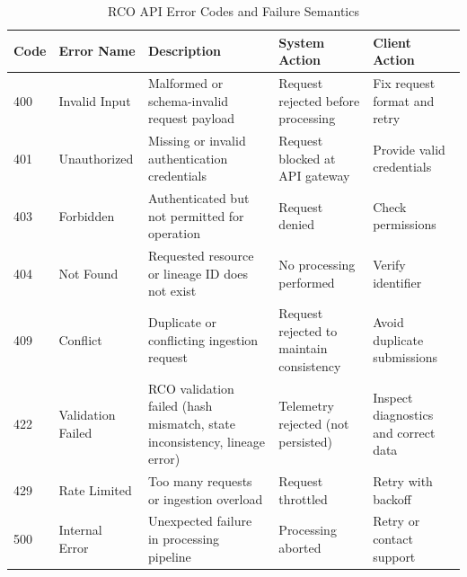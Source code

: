 \begin{table}[htbp]
\footnotesize
\centering
\caption{RCO API Error Codes and Failure Semantics}
\label{tab:error-codes}

\renewcommand{\arraystretch}{1.25}

\begin{tabularx}{\textwidth}{|p{2cm}|p{3cm}|X|X|X|}
\hline
\textbf{Code} & \textbf{Error Name} & \textbf{Description} & \textbf{System Action} & \textbf{Client Action} \\
\hline

400 & Invalid Input & Malformed or schema-invalid request payload & Request rejected before processing & Fix request format and retry \\

\hline

401 & Unauthorized & Missing or invalid authentication credentials & Request blocked at API gateway & Provide valid credentials \\

\hline

403 & Forbidden & Authenticated but not permitted for operation & Request denied & Check permissions \\

\hline

404 & Not Found & Requested resource or lineage ID does not exist & No processing performed & Verify identifier \\

\hline

409 & Conflict & Duplicate or conflicting ingestion request & Request rejected to maintain consistency & Avoid duplicate submissions \\

\hline

422 & Validation Failed & RCO validation failed (hash mismatch, state inconsistency, lineage error) & Telemetry rejected (not persisted) & Inspect diagnostics and correct data \\

\hline

429 & Rate Limited & Too many requests or ingestion overload & Request throttled & Retry with backoff \\

\hline

500 & Internal Error & Unexpected failure in processing pipeline & Processing aborted & Retry or contact support \\

\hline


\end{tabularx}
\end{table}

